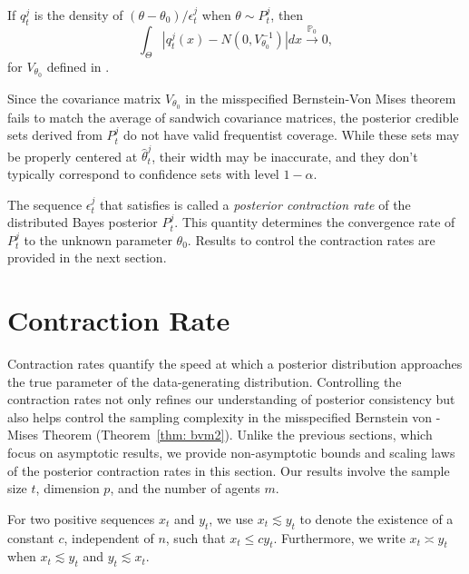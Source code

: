 \documentclass[twoside,11pt]{article}
\numberwithin{equation}{section}
\newcommand\bP{\mathbb{P}}
\newcommand{\pto}{\stackrel{\bP_0}{\to}}
\begin{document}
{\begin{theorem} 
If $q_t^j$ is the density of $(\theta - \theta_0)/\epsilon_t^j$ when $\theta \sim P_t^j$, then
\begin{equation*}\label{eqn:bvm2-main-result}
    \int_\Theta |q_t^j(x) - N(0, V_{\theta_0}^{-1})| dx \pto 0, 
\end{equation*}
for $V_{\theta_0}$ defined in . 
\end{theorem}
Since the covariance matrix $V_{\theta_0}$ in the misspecified Bernstein-Von Mises theorem fails to match the average of sandwich covariance matrices, the posterior credible sets derived from $P_t^j$ do not have valid frequentist coverage. While these sets may be properly centered at $\hat \theta_t^j$, their width may be inaccurate, and they don't typically correspond to confidence sets with level $1 - \alpha$. 

The sequence $\epsilon_t^j$ that satisfies  is called a \textit{posterior contraction rate} of the distributed Bayes posterior $P_t^j$. This quantity determines the convergence rate of $P_t^j$ to the unknown parameter $\theta_0$. Results to control the contraction rates are provided in the next section.



\section{Contraction Rate} \label{sect: contraction}


Contraction rates quantify the speed at which a posterior distribution approaches the true parameter of the data-generating distribution. Controlling the contraction rates not only refines our understanding of posterior consistency but also helps control the sampling complexity in the misspecified Bernstein von - Mises Theorem (Theorem~\ref{thm: bvm2}). Unlike the previous sections, which focus on asymptotic results, we provide non-asymptotic bounds and scaling laws of the posterior contraction rates in this section. Our results involve the sample size $t$, dimension $p$, and the number of agents $m$.

For two positive sequences $x_t$ and $y_t$, we use $x_t \lesssim y_t$ to denote the existence of a constant $c$, independent of $n$, such that $x_t \leq c y_t$. Furthermore, we write $x_t \asymp y_t$ when $x_t \lesssim y_t$ and $y_t \lesssim x_t$. 

}
\end{document}
